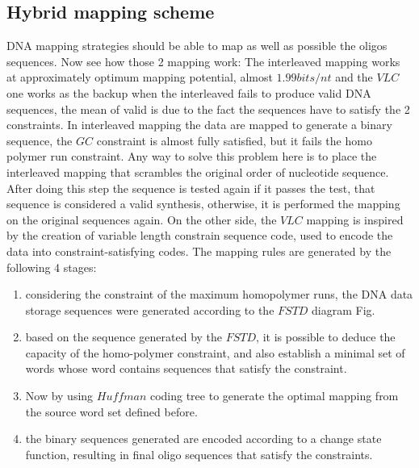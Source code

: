 \documentclass[10pt,twocolumn,twoside]{gsajnl}
\begin{document}
\subsection{Hybrid mapping scheme}
DNA mapping strategies should be able to map as well as possible the oligos sequences.
Now see how those 2 mapping work:
The interleaved mapping works at approximately optimum mapping potential, almost $1.99 bits/nt$ and the $VLC$ one works as the backup when the interleaved fails to produce valid DNA sequences, the mean of valid is due to the fact the sequences have to satisfy the 2 constraints.
In interleaved mapping the data are mapped to generate a binary sequence, the $GC$ constraint is almost fully satisfied, but it fails the homo polymer run constraint. Any way to solve this problem here is to place the interleaved mapping that scrambles the original order of nucleotide sequence. After doing this step the sequence is tested again if it passes the test, that sequence is considered a valid synthesis, otherwise, it is performed the mapping on the original sequences again.
On the other side, the $VLC$ mapping is inspired by the creation of variable length constrain sequence code, used to encode the data into constraint-satisfying codes. The mapping rules are generated by the following 4 stages:
\begin{enumerate}
    \item considering the constraint of the maximum homopolymer runs, the DNA data storage sequences were generated according to the $FSTD$ diagram Fig.
    \item based on the sequence generated by the $FSTD$, it is possible to deduce the capacity of the homo-polymer constraint, and also establish a minimal set of words whose word contains sequences that satisfy the constraint.
    \item Now by using $Huffman$ coding tree to generate the optimal mapping from the source word set defined before.
    \item the binary sequences generated are encoded according to a change state function, resulting in final oligo sequences that satisfy the constraints.
\end{enumerate}
\newpage
\end{document}
